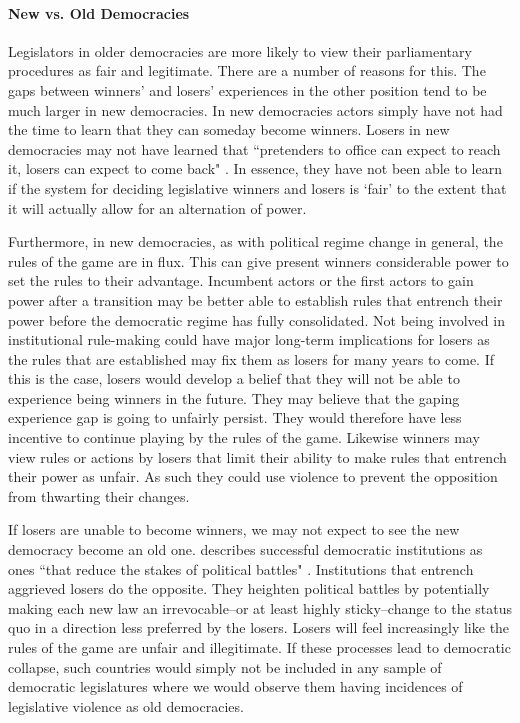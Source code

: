 \documentclass[a4paper]{article}\usepackage{graphicx, color}
\begin{document}
\paragraph{New vs. Old Democracies}

Legislators in older democracies are more likely to view their parliamentary procedures as fair and legitimate. There are a number of reasons for this. The gaps between winners' and losers' experiences in the other position tend to be much larger in new democracies. In new democracies actors simply have not had the time to learn that they can someday become winners. Losers in new democracies may not have learned that ``pretenders to office can expect to reach it, losers can expect to come back" \citep[][36]{Przeworski1991}. In essence, they have not been able to learn if the system for deciding legislative winners and losers is `fair' to the extent that it will actually allow for an alternation of power. 

Furthermore, in new democracies, as with political regime change in general, the rules of the game are in flux. This can give present winners considerable power to set the rules to their advantage. Incumbent actors or the first actors to gain power after a transition may be better able to establish rules that entrench their power \cite[108]{Saideman2002} before the democratic regime has fully consolidated. Not being involved in institutional rule-making could have major long-term implications for losers as the rules that are established may fix them as losers for many years to come. If this is the case, losers would develop a belief that they will not be able to experience being winners in the future. They may believe that the gaping experience gap is going to unfairly persist. They would therefore have less incentive to continue playing by the rules of the game. Likewise winners may view rules or actions by losers that limit their ability to make rules that entrench their power as unfair. As such they could use violence to prevent the opposition from thwarting their changes. 

If losers are unable to become winners, we may not expect to see the new democracy become an old one. \citeauthor{Przeworski1991} describes successful democratic institutions as ones ``that reduce the stakes of political battles" \citeyearpar[][36]{Przeworski1991}. Institutions that entrench aggrieved losers do the opposite. They heighten political battles by potentially making each new law an irrevocable--or at least highly sticky--change to the status quo in a direction less preferred by the losers. Losers will feel increasingly like the rules of the game are unfair and illegitimate. If these processes lead to democratic collapse, such countries would simply not be included in any sample of democratic legislatures where we would observe them having incidences of legislative violence as old democracies.
\end{document}
